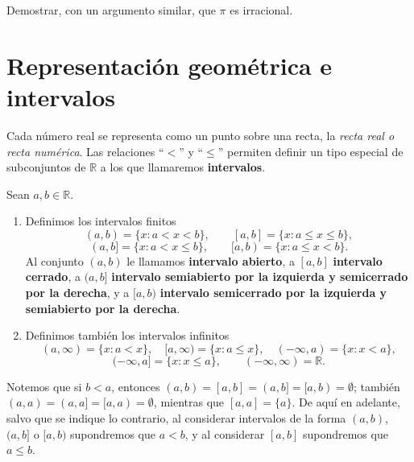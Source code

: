 \documentclass[12pt,a4paper]{book}
\begin{document}
  \begin{ejemplo}
    Demostrar, con un argumento similar, que $\pi$ es irracional.
  \end{ejemplo}
  
  \section{Representación geométrica e intervalos}
  
  Cada número real se representa como un punto sobre una recta, la \emph{recta real o recta numérica}. Las relaciones ``$<$'' y ``$\leq$'' permiten definir un tipo especial de subconjuntos de $\mathbb{R}$ a los que llamaremos \textbf{intervalos}.
  
  \begin{definicion}[Intervalos]
    Sean $a,b \in \mathbb{R}$.
    \begin{enumerate}[label=(\alph*)]
      \item Definimos los intervalos finitos
            \begin{equation*}
              (a,b) = \{x : a<x<b\}, \qquad [a,b] = \{x : a \leq x \leq b\},
            \end{equation*}
            \begin{equation*}
              (a,b] = \{x : a<x\leq b\}, \qquad [a,b) = \{x : a \leq x <b\}.
            \end{equation*}
            Al conjunto $(a,b)$ le llamamos \textbf{intervalo abierto}, a $[a,b]$ \textbf{intervalo cerrado}, a $(a,b]$ \textbf{intervalo semiabierto por la izquierda y semicerrado por la derecha}, y a $[a,b)$ \textbf{intervalo semicerrado por la izquierda y semiabierto por la derecha}.
      \item Definimos también los intervalos infinitos
            \begin{equation*}
              (a,\infty) = \{x : a<x\}, \quad [a,\infty) = \{x : a \leq x\}, \quad (-\infty,a) = \{x : x<a\},
            \end{equation*}
            \begin{equation*}
              (-\infty,a] = \{x : x \leq a\}, \qquad (-\infty,\infty) = \mathbb{R}.
            \end{equation*}
    \end{enumerate}
  \end{definicion}
  
  Notemos que si $b<a$, entonces $(a,b)=[a,b]=(a,b]=[a,b)=\emptyset$; también $(a,a)=(a,a]=[a,a)=\emptyset$, mientras que $[a,a]=\{a\}$. De aquí en adelante, salvo que se indique lo contrario, al considerar intervalos de la forma $(a,b)$, $(a,b]$ o $[a,b)$ supondremos que $a<b$, y al considerar $[a,b]$ supondremos que $a \leq b$.
  
\end{document}
